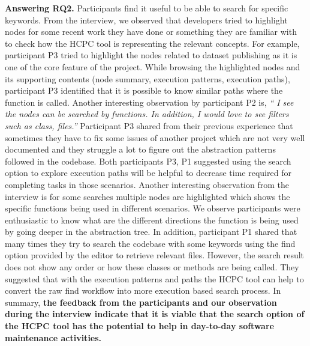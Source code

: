 \textbf{Answering RQ2.} Participants find it useful to be able to search for specific keywords. From the interview, we observed that developers tried to highlight nodes for some recent work they have done or something they are familiar with to check how the HCPC tool is representing the relevant concepts. For example, participant P3 tried to highlight the nodes related to dataset publishing as it is one of the core feature of the project. While browsing the highlighted nodes and its supporting contents (node summary, execution patterns, execution paths), participant P3 identified that it is possible to know similar paths where the function is called. Another interesting observation by participant P2 is, \emph{`` I see the nodes can be searched by functions. In addition, I would love to see filters such as class, files.''} Participant P3 shared from their previous experience that sometimes they have to fix some issues of another project which are not very well documented and they struggle a lot to figure out the abstraction patterns followed in the codebase. Both participants P3, P1 suggested using the search option to explore execution paths will be helpful to decrease time required for completing tasks in those scenarios. Another interesting observation from the interview is for some searches multiple nodes are highlighted which shows the specific functions being used in different scenarios. We observe participants were enthusiastic to know what are the different directions the function is being used by going deeper in the abstraction tree. In addition, participant P1 shared that many times they try to search the codebase with some keywords using the find option provided by the editor to retrieve relevant files. However, the search result does not show any order or how these classes or methods are being called. They suggested that with the execution patterns and paths  the HCPC tool can help to convert the raw find workflow into more execution based search process. In summary, \textbf{the feedback from the participants and our observation during the interview indicate that it is viable that the search option of the HCPC tool has the potential to help in day-to-day software maintenance activities. } 


